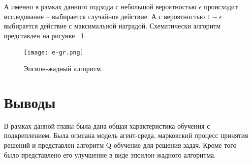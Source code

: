 А именно в рамках данного подхода с небольшой вероятностью $\epsilon$ происходит исследование  -- выбирается случайное действие. А с вероятностью $1-\epsilon$ выбирается действие с максимальной наградой. Схематически алгоритм представлен на рисунке ~\ref{fig:eps}. \newpage


\begin{figure}[h]
	\centering
	\texttt{[image: e-gr.png]}
	\caption {Эпсион-жадный алгоритм.}
	\label{fig:eps}
\end{figure}


\section{Выводы}\label{1sec:optimal-control}


В рамках данной главы была дана общая характеристика обучения с подкреплением. Была описана модель агент-среда, марковский процесс принятия решений и представлен алгоритм Q-обучение для решения задач. Кроме того было представлено его улучшение в виде эпсилон-жадного алгоритма.
